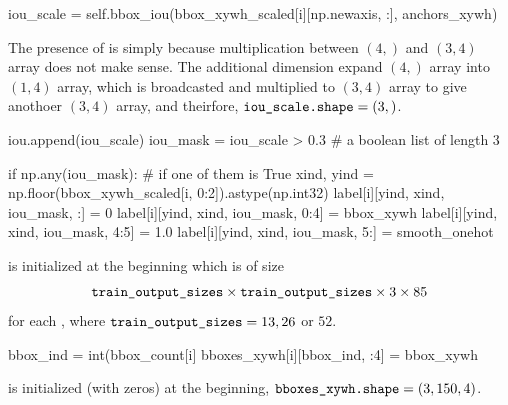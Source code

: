 \documentclass[10pt,a4paper]{article}
\begin{document}
\begin{py}
            iou_scale = self.bbox_iou(bbox_xywh_scaled[i][np.newaxis, :], anchors_xywh)
\end{py}
The presence of  is simply because multiplication between $(4,)$  and $(3,4)$ array does not make sense. The additional dimension expand $(4,)$ array into $(1,4)$ array, which is broadcasted and multiplied to $(3,4)$ array to give anothoer $(3,4)$ array, and theirfore, $\code{iou_scale.shape} = (3, )$.
\begin{py}
            iou.append(iou_scale)
            iou_mask = iou_scale > 0.3 # a boolean list of length 3

            if np.any(iou_mask): # if one of them is True
                xind, yind = np.floor(bbox_xywh_scaled[i, 0:2]).astype(np.int32)
                label[i][yind, xind, iou_mask, :] = 0
                label[i][yind, xind, iou_mask, 0:4] = bbox_xywh
                label[i][yind, xind, iou_mask, 4:5] = 1.0
                label[i][yind, xind, iou_mask, 5:] = smooth_onehot
\end{py}
 is initialized at the beginning which is of size 
\[\code{train_output_sizes}\times \code{train_output_sizes}\times 3\times 85\]
for each , where $\code{train_output_sizes} = 13,26$ or $52$. 
\begin{py}
                bbox_ind = int(bbox_count[i] %
                bboxes_xywh[i][bbox_ind, :4] = bbox_xywh
\end{py}
 is initialized (with zeros) at the beginning, $\code{bboxes_xywh.shape} = (3,150,4)$.
\end{document}
